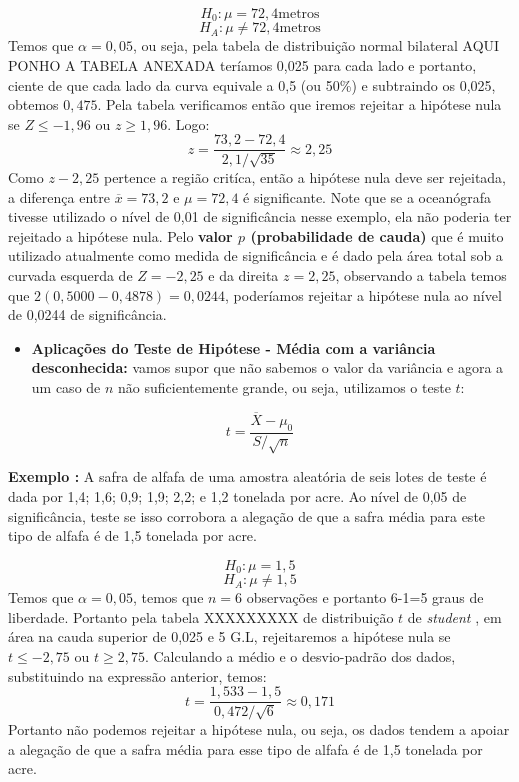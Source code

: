 \documentclass[
]{book}
\providecommand{\tightlist}{%
  \setlength{\itemsep}{0pt}\setlength{\parskip}{0pt}}
\begin{document}
\[H_0: \mu=72,4 \mbox{metros}\]
\[H_A: \mu \neq 72,4 \mbox{metros}\]
Temos que \(\alpha=0,05\), ou seja, pela tabela de distribuição normal bilateral AQUI PONHO A TABELA ANEXADA teríamos 0,025 para cada lado e portanto, ciente de que cada lado da curva equivale a 0,5 (ou 50\%) e subtraindo os 0,025, obtemos \(0,475\). Pela tabela verificamos então que iremos rejeitar a hipótese nula se \(Z \leq -1,96\) ou \(z \geq 1,96\). Logo:
\[z=\frac{73,2-72,4}{2,1/\sqrt{35}}\approx 2,25\]
Como \(z-2,25\) pertence a região critíca, então a hipótese nula deve ser rejeitada, a diferença entre \(\overline{x}=73,2\) e \(\mu=72,4\) é significante. Note que se a oceanógrafa tivesse utilizado o nível de 0,01 de significância nesse exemplo, ela não poderia ter rejeitado a hipótese nula. Pelo \textbf{valor \(p\) (probabilidade de cauda)} que é muito utilizado atualmente como medida de significância e é dado pela área total sob a curvada esquerda de \(Z=-2,25\) e da direita \(z=2,25\), observando a tabela temos que \(2(0,5000-0,4878)=0,0244\), poderíamos rejeitar a hipótese nula ao nível de 0,0244 de significância.

\begin{itemize}
\tightlist
\item
  \textbf{Aplicações do Teste de Hipótese - Média com a variância desconhecida:} vamos supor que não sabemos o valor da variância e agora a um caso de \(n\) não suficientemente grande, ou seja, utilizamos o teste \(t\):
\end{itemize}

\begin{equation} 
t=\frac{\overline{X}-\mu_0}{S/\sqrt{n}}
  \label{eq:testehipvardesc}
\end{equation}

\textbf{Exemplo \citep{freund2009estatistica}:} A safra de alfafa de uma amostra aleatória de seis lotes de teste é dada por 1,4; 1,6; 0,9; 1,9; 2,2; e 1,2 tonelada por acre. Ao nível de 0,05 de significância, teste se isso corrobora a alegação de que a safra média para este tipo de alfafa é de 1,5 tonelada por acre.

\[H_0: \mu=1,5\]
\[H_A: \mu\neq1,5\]
Temos que \(\alpha=0,05\), temos que \(n=6\) observações e portanto 6-1=5 graus de liberdade. Portanto pela tabela XXXXXXXXX de distribuição \(t\) de \emph{student} , em área na cauda superior de 0,025 e 5 G.L, rejeitaremos a hipótese nula se \(t\leq -2,75\) ou \(t\geq 2,75\). Calculando a médio e o desvio-padrão dos dados, substituindo na expressão anterior, temos:
\[t=\frac{1,533-1,5}{0,472/\sqrt{6}}\approx 0,171\]
Portanto não podemos rejeitar a hipótese nula, ou seja, os dados tendem a apoiar a alegação de que a safra média para esse tipo de alfafa é de 1,5 tonelada por acre.
\end{document}
